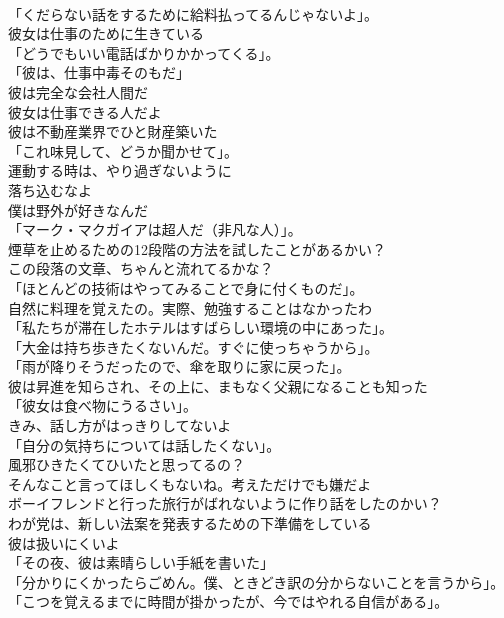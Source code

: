 \documentclass[8pt]{extreport}
\begin{document}
\begin{CJK}{UTF8}{min}
\\	「くだらない話をするために給料払ってるんじゃないよ」。	
\\	彼女は仕事のために生きている	
\\	「どうでもいい電話ばかりかかってくる」。	
\\	「彼は、仕事中毒そのもだ」	
\\	彼は完全な会社人間だ	
\\	彼女は仕事できる人だよ	
\\	彼は不動産業界でひと財産築いた	
\\	「これ味見して、どうか聞かせて」。	
\\	運動する時は、やり過ぎないように	
\\	落ち込むなよ	
\\	僕は野外が好きなんだ	
\\	「マーク・マクガイアは超人だ（非凡な人）」。	
\\	煙草を止めるための12段階の方法を試したことがあるかい？	
\\	この段落の文章、ちゃんと流れてるかな？	
\\	「ほとんどの技術はやってみることで身に付くものだ」。	
\\	自然に料理を覚えたの。実際、勉強することはなかったわ	
\\	「私たちが滞在したホテルはすばらしい環境の中にあった」。	
\\	「大金は持ち歩きたくないんだ。すぐに使っちゃうから」。	
\\	「雨が降りそうだったので、傘を取りに家に戻った」。	
\\	彼は昇進を知らされ、その上に、まもなく父親になることも知った	
\\	「彼女は食べ物にうるさい」。	
\\	きみ、話し方がはっきりしてないよ	
\\	「自分の気持ちについては話したくない」。	
\\	風邪ひきたくてひいたと思ってるの？	
\\	そんなこと言ってほしくもないね。考えただけでも嫌だよ	
\\	ボーイフレンドと行った旅行がばれないように作り話をしたのかい？	
\\	わが党は、新しい法案を発表するための下準備をしている	
\\	彼は扱いにくいよ	
\\	「その夜、彼は素晴らしい手紙を書いた」	
\\	「分かりにくかったらごめん。僕、ときどき訳の分からないことを言うから」。	
\\	「こつを覚えるまでに時間が掛かったが、今ではやれる自信がある」。	

\end{CJK}
\end{document}
